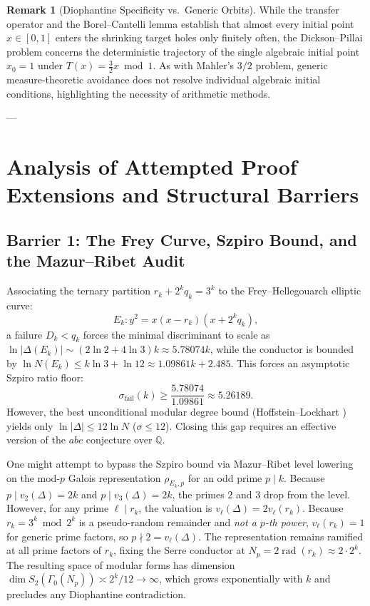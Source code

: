 \documentclass[11pt,reqno]{amsart}
\theoremstyle{definition}
\newtheorem{remark}[theorem]{Remark}
\numberwithin{equation}{section}
\begin{document}
\begin{remark}[Diophantine Specificity vs.\ Generic Orbits]
While the transfer operator and the Borel--Cantelli lemma establish that almost every initial point $x \in [0, 1]$ enters the shrinking target holes only finitely often, the Dickson--Pillai problem concerns the deterministic trajectory of the single algebraic initial point $x_0 = 1$ under $T(x) = \frac{3}{2} x \bmod 1$. As with Mahler's $3/2$ problem, generic measure-theoretic avoidance does not resolve individual algebraic initial conditions, highlighting the necessity of arithmetic methods.
\end{remark}

---

\section{Analysis of Attempted Proof Extensions and Structural Barriers}

\subsection{Barrier 1: The Frey Curve, Szpiro Bound, and the Mazur--Ribet Audit}
Associating the ternary partition $r_k + 2^k q_k = 3^k$ to the Frey--Hellegouarch elliptic curve:
\[
E_k : y^2 = x(x - r_k)(x + 2^k q_k),
\]
a failure $D_k < q_k$ forces the minimal discriminant to scale as $\ln |\Delta(E_k)| \sim (2\ln 2 + 4\ln 3)k \approx 5.78074 k$, while the conductor is bounded by $\ln N(E_k) \le k \ln 3 + \ln 12 \approx 1.09861 k + 2.485$.
This forces an asymptotic Szpiro ratio floor:
\begin{equation}
\sigma_{\mathrm{fail}}(k) \ge \frac{5.78074}{1.09861} \approx 5.26189.
\end{equation}
However, the best unconditional modular degree bound (Hoffstein--Lockhart \cite{hoffstein1994}) yields only $\ln |\Delta| \le 12 \ln N$ ($\sigma \le 12$). Closing this gap requires an effective version of the $abc$ conjecture over $\mathbb{Q}$.

One might attempt to bypass the Szpiro bound via Mazur--Ribet level lowering on the mod-$p$ Galois representation $\rho_{E_k, p}$ for an odd prime $p \mid k$. Because $p \mid v_2(\Delta) = 2k$ and $p \mid v_3(\Delta) = 2k$, the primes $2$ and $3$ drop from the level. However, for any prime $\ell \mid r_k$, the valuation is $v_\ell(\Delta) = 2 v_\ell(r_k)$. Because $r_k = 3^k \bmod 2^k$ is a pseudo-random remainder and \emph{not a $p$-th power}, $v_\ell(r_k) = 1$ for generic prime factors, so $p \nmid 2 = v_\ell(\Delta)$. The representation remains ramified at all prime factors of $r_k$, fixing the Serre conductor at $N_p = 2 \operatorname{rad}(r_k) \approx 2 \cdot 2^k$. The resulting space of modular forms has dimension $\dim S_2(\Gamma_0(N_p)) \asymp 2^k / 12 \to \infty$, which grows exponentially with $k$ and precludes any Diophantine contradiction.
\end{document}
